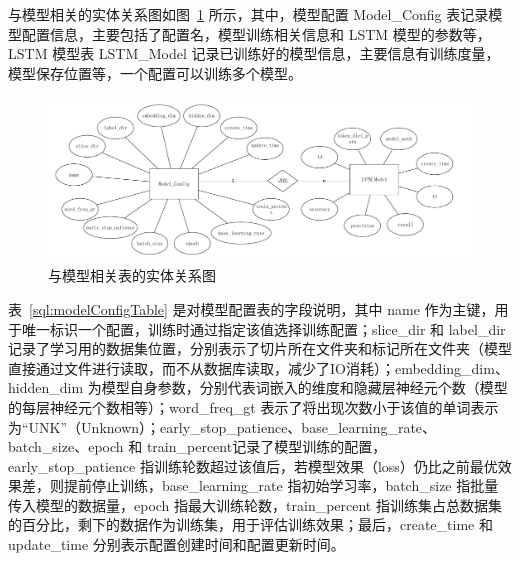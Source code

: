 与模型相关的实体关系图如图~\ref{er:model} 所示，其中，模型配置 Model\_Config 表记录模型配置信息，主要包括了配置名，模型训练相关信息和 LSTM 模型的参数等，LSTM 模型表 LSTM\_Model 记录已训练好的模型信息，主要信息有训练度量，模型保存位置等，一个配置可以训练多个模型。

\begin{figure}[!htbp]
	\centering
	\includegraphics[width=1\linewidth]{FIGs/chapter3/model_er.pdf}
	\caption{与模型相关表的实体关系图}\label{er:model}
\end{figure}

 表~\ref{sql:modelConfigTable} 是对模型配置表的字段说明，其中 name 作为主键，用于唯一标识一个配置，训练时通过指定该值选择训练配置；slice\_dir 和 label\_dir 记录了学习用的数据集位置，分别表示了切片所在文件夹和标记所在文件夹（模型直接通过文件进行读取，而不从数据库读取，减少了IO消耗）；embedding\_dim、hidden\_dim 为模型自身参数，分别代表词嵌入的维度和隐藏层神经元个数（模型的每层神经元个数相等）；word\_freq\_gt 表示了将出现次数小于该值的单词表示为“UNK”（Unknown）；early\_stop\_patience、base\_learning\_rate、batch\_size、epoch 和 train\_percent记录了模型训练的配置，early\_stop\_patience 指训练轮数超过该值后，若模型效果（loss）仍比之前最优效果差，则提前停止训练，base\_learning\_rate 指初始学习率，batch\_size 指批量传入模型的数据量，epoch 指最大训练轮数，train\_percent 指训练集占总数据集的百分比，剩下的数据作为训练集，用于评估训练效果；最后，create\_time 和 update\_time 分别表示配置创建时间和配置更新时间。

